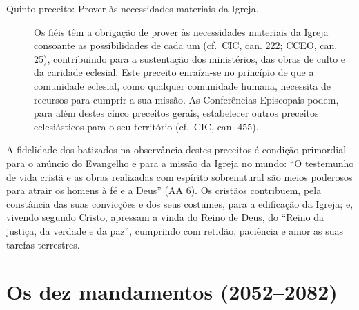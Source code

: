 \begin{description}
    \item[Quinto preceito: Prover às necessidades materiais da Igreja.] Os fiéis têm a obrigação de prover às necessidades materiais da Igreja consoante as possibilidades de cada um (cf.~CIC, can. 222; CCEO, can. 25), contribuindo para a sustentação dos ministérios, das obras de culto e da caridade eclesial. Este preceito enraíza-se no princípio de que a comunidade eclesial, como qualquer comunidade humana, necessita de recursos para cumprir a sua missão. As Conferências Episcopais podem, para além destes cinco preceitos gerais, estabelecer outros preceitos eclesiásticos para o seu território (cf.~CIC, can. 455).

\end{description}

A fidelidade dos batizados na observância destes preceitos é condição primordial para o anúncio do Evangelho e para a missão da Igreja no mundo: ``O testemunho de vida cristã e as obras realizadas com espírito sobrenatural são meios poderosos para atrair os homens à fé e a Deus'' (AA 6). Os cristãos contribuem, pela constância das suas convicções e dos seus costumes, para a edificação da Igreja; e, vivendo segundo Cristo, apressam a vinda do Reino de Deus, do ``Reino da justiça, da verdade e da paz'', cumprindo com retidão, paciência e amor as suas tarefas terrestres.

\section{Os dez mandamentos (2052--2082)}

